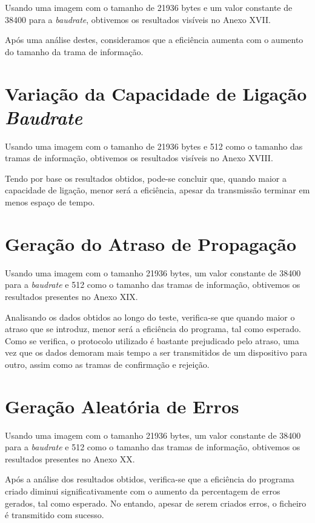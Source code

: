\documentclass[article, a4paper, 11pt, oneside]{memoir}
\begin{document}
Usando uma imagem com o tamanho de 21936 bytes e um valor constante de 38400 para
a \textit{baudrate}, obtivemos os resultados visíveis no Anexo XVII.

Após uma análise destes, consideramos que a eficiência aumenta com o aumento do
tamanho da trama de informação.

\section{Variação da Capacidade de Ligação \textit{Baudrate}}

Usando uma imagem com o tamanho de 21936 bytes e 512 como o tamanho das tramas de informação,
obtivemos os resultados visíveis no Anexo XVIII.

Tendo por base os resultados obtidos, pode-se concluir que, quando maior a capacidade de 
ligação, menor será a eficiência, apesar da transmissão terminar em menos espaço de tempo.

\section{Geração do Atraso de Propagação}

Usando uma imagem com o tamanho 21936 bytes, um valor constante de 38400 para
a \textit{baudrate} e 512 como o tamanho das tramas de informação, obtivemos os resultados
presentes no Anexo XIX.

Analisando os dados obtidos ao longo do teste, verifica-se que quando maior o atraso
que se introduz, menor será a eficiência do programa, tal como esperado.
Como se verifica, o protocolo utilizado é bastante prejudicado pelo atraso, uma vez que
os dados demoram mais tempo a ser transmitidos de um dispositivo para outro,
assim como as tramas de confirmação e rejeição.

\section{Geração Aleatória de Erros}

Usando uma imagem com o tamanho 21936 bytes, um valor constante de 38400 para
a \textit{baudrate} e 512 como o tamanho das tramas de informação, obtivemos os resultados
presentes no  Anexo XX.

Após a análise dos resultados obtidos, verifica-se que a eficiência do programa criado diminui
significativamente com o aumento da percentagem de erros gerados, tal como esperado. No entando,
apesar de serem criados erros, o ficheiro é transmitido com sucesso.
\end{document}
